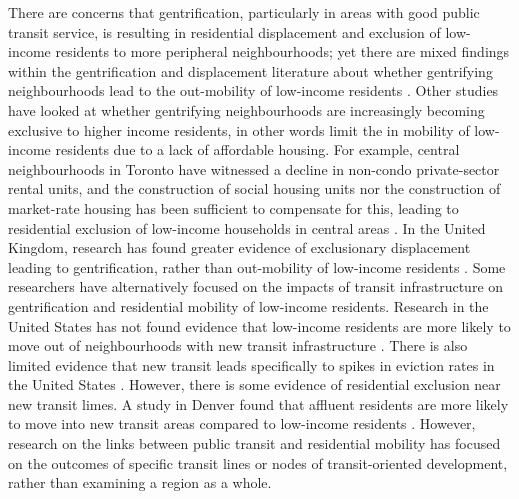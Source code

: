 There are concerns that gentrification, particularly in areas with good public transit service, is resulting in residential displacement and exclusion of low-income residents to more peripheral neighbourhoods; yet there are mixed findings within the gentrification and displacement literature about whether gentrifying neighbourhoods lead to the out-mobility of low-income residents \cite{freeman_displacement_2005,ellen_how_2011,mckinnish_who_2010,ding_gentrification_2016}. Other studies have looked at whether gentrifying neighbourhoods are increasingly becoming exclusive to higher income residents, in other words limit the in mobility of low-income residents due to a lack of affordable housing. For example, central neighbourhoods in Toronto have witnessed a decline in non-condo private-sector rental units, and the construction of social housing units nor the construction of market-rate housing has been sufficient to compensate for this, leading to residential exclusion of low-income households in central areas \cite{walks_gentrification_2021}. In the United Kingdom, research has found greater evidence of exclusionary displacement leading to gentrification, rather than out-mobility of low-income residents \cite{fransham_neighbourhood_2020}. Some researchers have alternatively focused on the impacts of transit infrastructure on gentrification and residential mobility of low-income residents. Research in the United States has not found evidence that low-income residents are more likely to move out of neighbourhoods with new transit infrastructure \cite{delmelle_new_2020}. There is also limited evidence that new transit leads specifically to spikes in eviction rates in the United States \cite{delmelle_investigating_2021}. However, there is some evidence of residential exclusion near new transit limes. A study in Denver found that affluent residents are more likely to move into new transit areas compared to low-income residents \cite{luckey_residential_2018}. However, research on the links between public transit and residential mobility has focused on the outcomes of specific transit lines or nodes of transit-oriented development, rather than examining a region as a whole.


